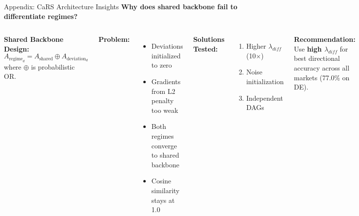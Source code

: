 \documentclass[aspectratio=169]{beamer}
\begin{document}
\begin{frame}{Appendix: CaRS Architecture Insights}
\textbf{Why does shared backbone fail to differentiate regimes?}

\vspace{0.1cm}
\begin{columns}[T]
\textbf{Shared Backbone Design:}
\begin{equation*}
A_{\text{regime}_d} = A_{\text{shared}} \oplus A_{\text{deviation}_d}
\end{equation*}
where $\oplus$ is probabilistic OR.

\vspace{0.1cm}
\textbf{Problem:}
\begin{itemize}
    \item Deviations initialized to zero
    \item Gradients from L2 penalty too weak
    \item Both regimes converge to shared backbone
    \item Cosine similarity stays at 1.0
\end{itemize}

\textbf{Solutions Tested:}
\begin{enumerate}
    \item \textcolor{green}{} Higher $\lambda_{diff}$ (10$\times$)
    \item \textcolor{orange}{} Noise initialization
    \item \textcolor{green}{} Independent DAGs
\end{enumerate}

\vspace{0.1cm}
\textbf{Recommendation:}\\
Use \textbf{high $\lambda_{diff}$} for best directional accuracy across all markets (77.0\% on DE).
\end{columns}

\vspace{0.1cm}
\begin{center}
\end{center}
\end{frame}
\end{document}
